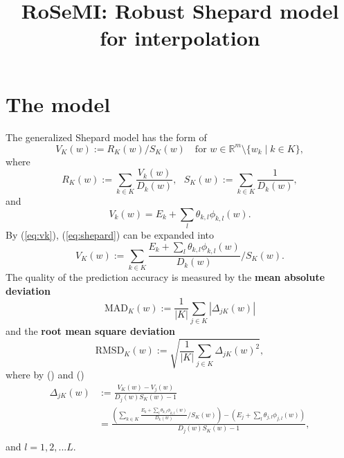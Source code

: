 \documentclass[12pt]{article}
\title{RoSeMI: Robust Shepard model for interpolation}
\def\D{\displaystyle}
\begin{document}
\maketitle


\section{The model}
The generalized Shepard model has the form of 
\begin{equation}
    \label{eq:shepard}
    V_K(w):=R_K(w)/S_K(w) ~~~ \text{ for } w \in \mathbb{R}^m \setminus \{w_k\mid k\in K \},
\end{equation}
where
\begin{equation}
    R_K(w):=\sum_{k\in K} \frac{V_k(w)}{D_k(w)},~~~
    S_K(w):=\sum_{k\in K} \frac{1}{D_k(w)},
\end{equation}
and
\begin{equation}
    \label{eq:vk}
    V_k(w) = E_k + \sum_l \theta_{k,l} \phi_{k,l}(w).
\end{equation}
By (\ref{eq:vk}), (\ref{eq:shepard}) can be expanded into
\begin{equation}
    \label{eq:vk_expand}
    V_K(w) := \sum_{k\in K} \frac{E_k + \sum_l \theta_{k,l} \phi_{k,l}(w)}{D_k(w)} / S_K(w). 
\end{equation}
The quality of the prediction accuracy is measured by the \textbf{mean absolute deviation}
\begin{equation}
    \text{MAD}_K(w) := \frac{1}{|K|}\sum_{j\in K}|\Delta_{jK}(w)|
\end{equation}
and the \textbf{root mean square deviation}
\begin{equation}
    \text{RMSD}_K(w) := \sqrt{\frac{1}{|K|}\sum_{j\in K}\Delta_{jK}(w)^2},
\end{equation}
where by () and ()
\begin{equation}
    \label{eq:delta}
    \begin{split}
        \Delta_{jK}(w)&:=\D\frac{V_K(w)-V_j(w)}{D_j(w)S_K(w)-1} \\
        &= \frac{\D \left(\sum_{k\in K} \frac{E_k + \sum_l \theta_{k,l} \phi_{k,l}(w)}{D_k(w)} / S_K(w)\right) - \left(E_j + \sum_l \theta_{j,l} \phi_{j,l}(w)\right)}{D_j(w)S_K(w)-1}, \\
    \end{split}
\end{equation}
and $l=1,2,...L$.
\end{document}
